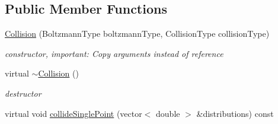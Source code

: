 \subsection*{Public Member Functions}
\begin{DoxyCompactItemize}
\item 
\hyperlink{classnatrium_1_1Collision_a2a18af16681cbcea3ff0ebba132094f5}{Collision} (Boltzmann\-Type boltzmann\-Type, Collision\-Type collision\-Type)
\begin{DoxyCompactList}\small\item\em constructor, important\-: Copy arguments instead of reference \end{DoxyCompactList}\item 
\hypertarget{classnatrium_1_1Collision_aafa5f1a6f7da61df7c9ef54369dc8fed}{virtual \hyperlink{classnatrium_1_1Collision_aafa5f1a6f7da61df7c9ef54369dc8fed}{$\sim$\-Collision} ()}\label{classnatrium_1_1Collision_aafa5f1a6f7da61df7c9ef54369dc8fed}

\begin{DoxyCompactList}\small\item\em destructor \end{DoxyCompactList}\item 
\hypertarget{classnatrium_1_1Collision_ae6d6c234ac922a0602f4882ad19b4608}{virtual void \hyperlink{classnatrium_1_1Collision_ae6d6c234ac922a0602f4882ad19b4608}{collide\-Single\-Point} (vector$<$ double $>$ \&distributions) const }\label{classnatrium_1_1Collision_ae6d6c234ac922a0602f4882ad19b4608}


\end{DoxyCompactItemize}
